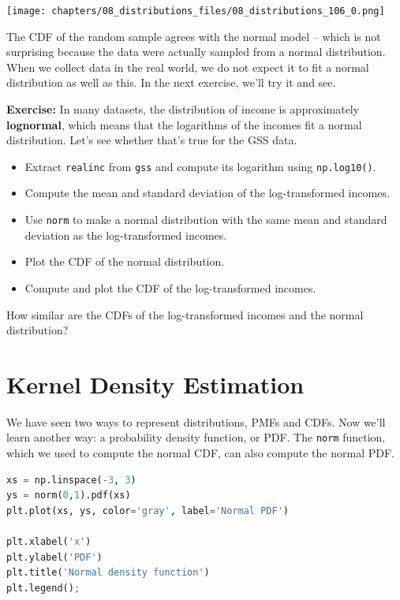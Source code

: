 \begin{center}
\texttt{[image: chapters/08\_distributions\_files/08\_distributions\_106\_0.png]}
\end{center}

The CDF of the random sample agrees with the normal model -- which is
not surprising because the data were actually sampled from a normal
distribution. When we collect data in the real world, we do not expect
it to fit a normal distribution as well as this. In the next exercise,
we'll try it and see.

\textbf{Exercise:} In many datasets, the distribution of income is
approximately \textbf{lognormal}, which means that the logarithms of the
incomes fit a normal distribution. Let's see whether that's true for the
GSS data.

\begin{itemize}
\item
  Extract \passthrough{\lstinline!realinc!} from
  \passthrough{\lstinline!gss!} and compute its logarithm using
  \passthrough{\lstinline!np.log10()!}.
\item
  Compute the mean and standard deviation of the log-transformed
  incomes.
\item
  Use \passthrough{\lstinline!norm!} to make a normal distribution with
  the same mean and standard deviation as the log-transformed incomes.
\item
  Plot the CDF of the normal distribution.
\item
  Compute and plot the CDF of the log-transformed incomes.
\end{itemize}

How similar are the CDFs of the log-transformed incomes and the normal
distribution?

\hypertarget{kernel-density-estimation}{%
\section{Kernel Density Estimation}\label{kernel-density-estimation}}

We have seen two ways to represent distributions, PMFs and CDFs. Now
we'll learn another way: a probability density function, or PDF. The
\passthrough{\lstinline!norm!} function, which we used to compute the
normal CDF, can also compute the normal PDF.

\begin{lstlisting}[language=Python,style=source]
xs = np.linspace(-3, 3)
ys = norm(0,1).pdf(xs)
plt.plot(xs, ys, color='gray', label='Normal PDF')

plt.xlabel('x')
plt.ylabel('PDF')
plt.title('Normal density function')
plt.legend();
\end{lstlisting}

